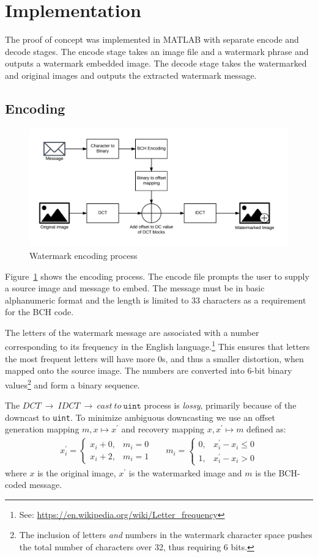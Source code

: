 \section{Implementation}\label{sec:impl}
The proof of concept was implemented in MATLAB with separate encode and decode stages.
The encode stage takes an image file and a watermark phrase and outputs a watermark embedded image.
The decode stage takes the watermarked and original images and outputs the extracted watermark message.

\subsection{Encoding}\label{sec:enc}
\begin{figure}[tbph]
  \centering
  \includegraphics[width=0.75\linewidth]{graphics/encode}
  \caption{Watermark encoding process}
  \label{fig:encode}
\end{figure}

Figure~\ref{fig:encode} shows the encoding process.
The encode file prompts the user to supply a source image and message to embed.
The message must be in basic alphanumeric format and the length is limited to 33 characters as a requirement for the BCH code.

The letters of the watermark message are associated with a number corresponding to its frequency in the English language.\footnote{See: \url{https://en.wikipedia.org/wiki/Letter_frequency}}
This ensures that letters the most frequent letters will have more 0s, and thus a smaller distortion, when mapped onto the source image.
The numbers are converted into 6-bit binary values\footnote{The inclusion of letters \textit{and} numbers in the watermark character space pushes the total number of characters over 32, thus requiring 6 bits.} and form a binary sequence.

The $DCT~\rightarrow~IDCT~\rightarrow~cast~to~\texttt{uint}$ process is \textit{lossy}, primarily because of the downcast to \texttt{uint}.
To minimize ambiguous downcasting we use an offset generation mapping $m,x \mapsto x^{\prime}$ and recovery mapping $ x,x^{\prime} \mapsto m$ defined as:
\begin{align*}
x^{\prime}_i = \begin{cases}
x_i + 0, & m_i = 0\\
x_i + 2, & m_i = 1
\end{cases}
&&
m_i = \begin{cases}
0, & x^{\prime}_i - x_i \le 0 \\
1, & x^{\prime}_i - x_i> 0
\end{cases}
\end{align*}
where $x$ is the original image, $x^{\prime}$ is the watermarked image and $m$ is the BCH-coded message.

